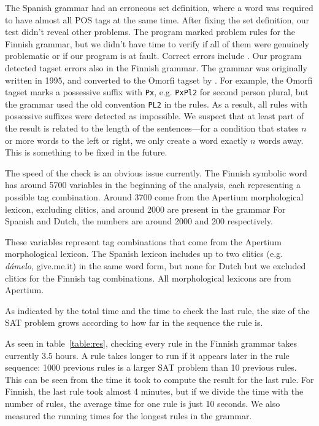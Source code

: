 The Spanish grammar had an erroneous set definition, where a word was required to have almost all POS tags at the same time. After fixing the set definition, our test didn't reveal other problems.
The program marked  problem rules for the Finnish grammar, but we didn't have time to verify if all of them were genuinely problematic or if our program is at fault.
Correct errors include .
Our program detected tagset errors also in the Finnish grammar.
The grammar was originally written in 1995, and converted to the Omorfi tagset by \cite{pirinen2015}. 
For example, the Omorfi tagset marks a possessive suffix with \texttt{Px}, e.g. \texttt{PxPl2} for second person plural, but the grammar used the old convention \texttt{PL2} in the rules.
As a result, all rules with possessive suffixes were detected as impossible.
We suspect that at least part of the result is related to the length of the sentences---for a condition that states $n$ or more words to the left or right, we only create a word exactly $n$ words away. This is something to be fixed in the future.

The speed of the check is an obvious issue currently.
The Finnish symbolic word has around 5700 variables in the beginning of the analysis, each representing a possible tag combination.
Around 3700 come from the Apertium morphological lexicon, excluding clitics, and around 2000 are present in the grammar
For Spanish and Dutch, the numbers are around 2000 and 200 respectively.

These variables represent tag combinations that come from the Apertium morphological lexicon. 
The Spanish lexicon includes up to two clitics (e.g. \emph{dámelo}, give.me.it) in the same word form, but none for Dutch but we excluded clitics for the Finnish tag combinations.
All morphological lexicons are from Apertium.

As indicated by the total time and the time to check the last rule, the size of the SAT problem grows according to how far in the sequence the rule is.

As seen in table~\ref{table:res}, checking every rule in the Finnish grammar takes currently 3.5 hours.
A rule takes longer to run if it appears later in the rule sequence: 1000 previous rules is a larger SAT problem than 10 previous rules.
This can be seen from the time it took to compute the result for the last rule. For Finnish, the last rule took almost 4 minutes, but if we divide the time with the number of rules, the average time for one rule is just 10 seconds.
We also measured the running times for the longest rules in the grammar.


